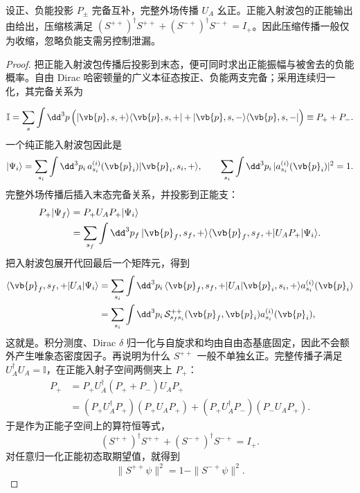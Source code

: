 \begin{proposition}[幺正传播的正能压缩与泄漏]
设正、负能投影 $P_\pm$ 完备互补，完整外场传播 $U_A$ 幺正。正能入射波包的正能输出由给出，压缩核满足 $(S^{++})^\dagger S^{++}+(S^{-+})^\dagger S^{-+}=I_+$。因此压缩传播一般仅为收缩，忽略负能支需另控制泄漏。
\end{proposition}
\begin{proof}
把正能入射波包传播后投影到末态，便可同时求出正能振幅与被舍去的负能概率。自由 Dirac 哈密顿量的广义本征态按正、负能两支完备；采用连续归一化，其完备关系为

\begin{equation*}
\mathbb I
=\sum_s\int\dd^3 p\,
\Bigl(
|\vb{p},s,+\rangle\langle\vb{p},s,+|
+|\vb{p},s,-\rangle\langle\vb{p},s,-|
\Bigr)
\equiv P_++P_-.
\end{equation*}
一个纯正能入射波包因此是
\begin{equation*}
|\Psi_i\rangle
=\sum_{s_i}\int\dd^3 p_i\,
 a^{(i)}_{s_i}(\vb{p}_i)|\vb{p}_i,s_i,+\rangle,
\qquad
\sum_{s_i}\int\dd^3 p_i\,
|a^{(i)}_{s_i}(\vb{p}_i)|^2=1.
\end{equation*}
完整外场传播后插入末态完备关系，并投影到正能支：
\begin{align*}
P_+|\Psi_f\rangle
&=P_+U_AP_+|\Psi_i\rangle\\
&=\sum_{s_f}\int\dd^3 p_f\,
|\vb{p}_f,s_f,+\rangle
\langle\vb{p}_f,s_f,+|U_AP_+|\Psi_i\rangle.
\end{align*}
把入射波包展开代回最后一个矩阵元，得到
\begin{align*}
\langle\vb{p}_f,s_f,+|U_A|\Psi_i\rangle
&=\sum_{s_i}\int\dd^3 p_i\,
\langle\vb{p}_f,s_f,+|U_A|\vb{p}_i,s_i,+\rangle
 a^{(i)}_{s_i}(\vb{p}_i)\\
&=\sum_{s_i}\int\dd^3 p_i\,
\mathcal S^{++}_{s_fs_i}(\vb{p}_f,\vb{p}_i)
 a^{(i)}_{s_i}(\vb{p}_i),
\end{align*}
这就是。积分测度、Dirac $\delta$ 归一化与自旋求和均由自由态基底固定，因此不会额外产生唯象态密度因子。再说明为什么 $S^{++}$ 一般不单独幺正。完整传播子满足 $U_A^\dagger U_A=\mathbb I$，在正能入射子空间两侧夹上 $P_+$：
\begin{align*}
P_+
&=P_+U_A^\dagger(P_++P_-)U_AP_+\\
&=(P_+U_A^\dagger P_+)(P_+U_AP_+)
 +(P_+U_A^\dagger P_-)(P_-U_AP_+).
\end{align*}
于是作为正能子空间上的算符恒等式，
\begin{equation*}
(S^{++})^\dagger S^{++}+(S^{-+})^\dagger S^{-+}=I_+.
\end{equation*}
对任意归一化正能初态取期望值，就得到
\begin{equation*}
\|S^{++}\psi\|^2
=1-\|S^{-+}\psi\|^2.
\end{equation*}
\end{proof}


